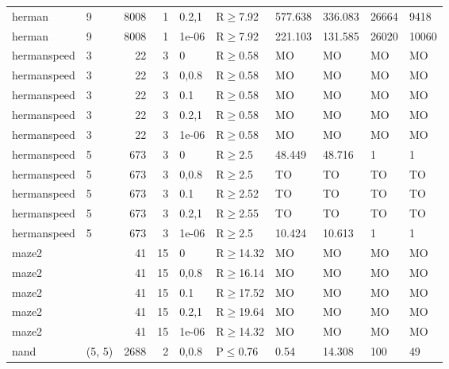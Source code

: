 \begin{longtable}{llrrllllll}
 herman        & 9         &   	8008 &   1 & 0.2,1 & R$\geq$7.92  & 577.638  & 336.083  & 26664   & 9418   \\
 herman        & 9         &   	8008 &   1 & 1e-06 & R$\geq$7.92  & 221.103  & 131.585  & 26020   & 10060  \\
 hermanspeed   & 3         &     	22 &   3 & 0     & R$\geq$0.58  & MO       & MO       & MO      & MO     \\
 hermanspeed   & 3         &     	22 &   3 & 0,0.8 & R$\geq$0.58  & MO       & MO       & MO      & MO     \\
 hermanspeed   & 3         &     	22 &   3 & 0.1   & R$\geq$0.58  & MO       & MO       & MO      & MO     \\
 hermanspeed   & 3         &     	22 &   3 & 0.2,1 & R$\geq$0.58  & MO       & MO       & MO      & MO     \\
 hermanspeed   & 3         &     	22 &   3 & 1e-06 & R$\geq$0.58  & MO       & MO       & MO      & MO     \\
 hermanspeed   & 5         &    	673 &   3 & 0     & R$\geq$2.5   & 48.449   & 48.716   & 1       & 1      \\
 hermanspeed   & 5         &    	673 &   3 & 0,0.8 & R$\geq$2.5   & TO       & TO       & TO      & TO     \\
 hermanspeed   & 5         &    	673 &   3 & 0.1   & R$\geq$2.52  & TO       & TO       & TO      & TO     \\
 hermanspeed   & 5         &    	673 &   3 & 0.2,1 & R$\geq$2.55  & TO       & TO       & TO      & TO     \\
 hermanspeed   & 5         &    	673 &   3 & 1e-06 & R$\geq$2.5   & 10.424   & 10.613   & 1       & 1      \\
 maze2         &           &     	41 &  15 & 0     & R$\geq$14.32 & MO       & MO       & MO      & MO     \\
 maze2         &           &     	41 &  15 & 0,0.8 & R$\geq$16.14 & MO       & MO       & MO      & MO     \\
 maze2         &           &     	41 &  15 & 0.1   & R$\geq$17.52 & MO       & MO       & MO      & MO     \\
 maze2         &           &     	41 &  15 & 0.2,1 & R$\geq$19.64 & MO       & MO       & MO      & MO     \\
 maze2         &           &     	41 &  15 & 1e-06 & R$\geq$14.32 & MO       & MO       & MO      & MO     \\
 nand          & (5, 5)    &   	2688 &   2 & 0,0.8 & P$\leq$0.76  & 0.54     & 14.308   & 100     & 49     \\

\end{longtable}
